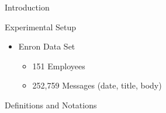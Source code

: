 \message{ !name(poster.tex)}\documentclass[final,t]{beamer}
\begin{document}
\begin{frame}{}
\begin{columns}[t]
\begin{column}{.3\linewidth}
\begin{block}{Introduction}
            \end{block}

            
            \begin{block}{Experimental Setup}
       
            \begin{itemize}
            \item Enron Data Set
              \begin{itemize}
              \item \alert{151 Employees}
              \item 252,759 Messages (date, title, body)
              \end{itemize}
            \end{itemize}

         

      \end{block}
      
      \begin{block}{Definitions and Notations}
        

\end{block}
\end{column}
\end{columns}
\end{frame}
\end{document}
